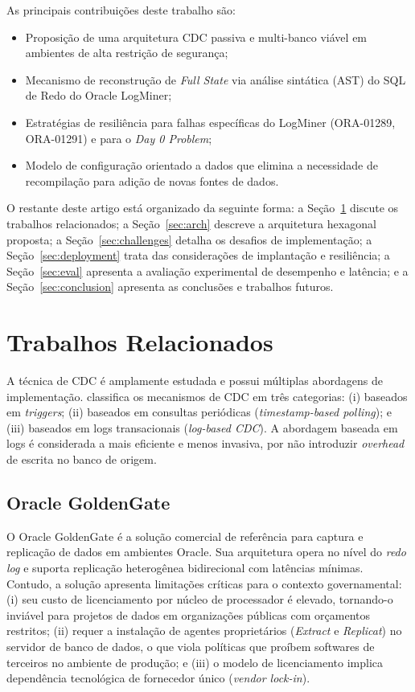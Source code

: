 \documentclass[12pt]{article}
\begin{document}
As principais contribuições deste trabalho são:
\begin{itemize}
  \item Proposição de uma arquitetura CDC passiva e multi-banco viável em
        ambientes de alta restrição de segurança;
  \item Mecanismo de reconstrução de \textit{Full State} via análise
        sintática (AST) do SQL de Redo do Oracle LogMiner;
  \item Estratégias de resiliência para falhas específicas do LogMiner
        (ORA-01289, ORA-01291) e para o \textit{Day 0 Problem};
  \item Modelo de configuração orientado a dados que elimina a necessidade
        de recompilação para adição de novas fontes de dados.
\end{itemize}

O restante deste artigo está organizado da seguinte forma: a
Seção~\ref{sec:related} discute os trabalhos relacionados; a
Seção~\ref{sec:arch} descreve a arquitetura hexagonal proposta; a
Seção~\ref{sec:challenges} detalha os desafios de implementação; a
Seção~\ref{sec:deployment} trata das considerações de implantação e
resiliência; a Seção~\ref{sec:eval} apresenta a avaliação experimental
de desempenho e latência; e a Seção~\ref{sec:conclusion} apresenta as
conclusões e trabalhos futuros.


\section{Trabalhos Relacionados}
\label{sec:related}

A técnica de CDC é amplamente estudada e possui múltiplas abordagens de
implementação. \cite{kleppmann:2017} classifica os mecanismos de CDC em
três categorias: (i) baseados em \textit{triggers}; (ii) baseados em
consultas periódicas (\textit{timestamp-based polling}); e (iii) baseados
em logs transacionais (\textit{log-based CDC}). A abordagem baseada em
logs é considerada a mais eficiente e menos invasiva, por não introduzir
\textit{overhead} de escrita no banco de origem.

\subsection{Oracle GoldenGate}

O Oracle GoldenGate é a solução comercial de referência para captura e
replicação de dados em ambientes Oracle. Sua arquitetura opera no nível
do \textit{redo log} e suporta replicação heterogênea bidirecional com
latências mínimas. Contudo, a solução apresenta limitações críticas para
o contexto governamental: (i) seu custo de licenciamento por núcleo de
processador é elevado, tornando-o inviável para projetos de dados em
organizações públicas com orçamentos restritos; (ii) requer a instalação
de agentes proprietários (\textit{Extract} e \textit{Replicat}) no servidor
de banco de dados, o que viola políticas que proíbem softwares de terceiros
no ambiente de produção; e (iii) o modelo de licenciamento implica
dependência tecnológica de fornecedor único (\textit{vendor lock-in}).
\end{document}
